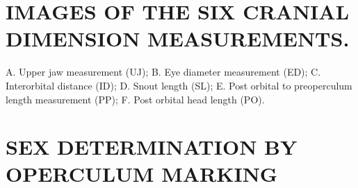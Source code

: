 \documentclass[12pt]{article}\usepackage[]{graphicx}\usepackage[]{color}
\begin{document}
\begin{appendices}

\clearpage

\section{IMAGES OF THE SIX CRANIAL DIMENSION MEASUREMENTS.}
\label{app:first-appendix}

A. Upper jaw measurement (UJ); B. Eye diameter measurement (ED); C. Interorbital distance (ID); D. Snout length (SL); E. Post orbital to preoperculum length measurement (PP); F. Post orbital head length (PO).
\begin{center} \end{center}

\clearpage

\section{SEX DETERMINATION BY OPERCULUM MARKING}
\label{app:second-appendix}


\end{appendices}
\end{document}
